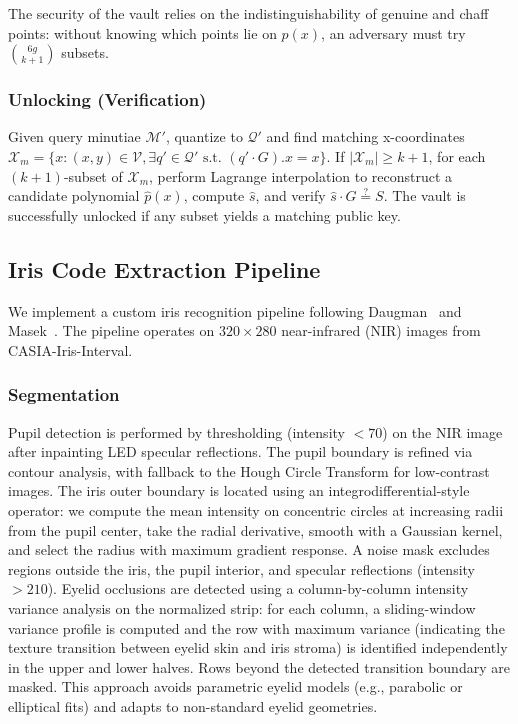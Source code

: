 \documentclass[3p,twocolumn]{elsarticle}
\begin{document}
The security of the vault relies on the indistinguishability of genuine and chaff points: without knowing which points lie on $p(x)$, an adversary must try $\binom{6g}{k+1}$ subsets.

\subsubsection{Unlocking (Verification)}
Given query minutiae $\mathcal{M}'$, quantize to $\mathcal{Q}'$ and find matching x-coordinates $\mathcal{X}_m = \{x : (x,y) \in \mathcal{V}, \exists q' \in \mathcal{Q}' \text{ s.t. } (q' \cdot G).x = x\}$. If $|\mathcal{X}_m| \geq k+1$, for each $(k{+}1)$-subset of $\mathcal{X}_m$, perform Lagrange interpolation to reconstruct a candidate polynomial $\hat{p}(x)$, compute $\hat{s}$, and verify $\hat{s} \cdot G \stackrel{?}{=} S$. The vault is successfully unlocked if any subset yields a matching public key.

\subsection{Iris Code Extraction Pipeline}
\label{sec:iris_extraction}

We implement a custom iris recognition pipeline following Daugman~\cite{daugman2004how} and Masek~\cite{masek2003thesis}. The pipeline operates on $320 \times 280$ near-infrared (NIR) images from CASIA-Iris-Interval.

\subsubsection{Segmentation}
Pupil detection is performed by thresholding (intensity $< 70$) on the NIR image after inpainting LED specular reflections. The pupil boundary is refined via contour analysis, with fallback to the Hough Circle Transform for low-contrast images. The iris outer boundary is located using an integrodifferential-style operator: we compute the mean intensity on concentric circles at increasing radii from the pupil center, take the radial derivative, smooth with a Gaussian kernel, and select the radius with maximum gradient response. A noise mask excludes regions outside the iris, the pupil interior, and specular reflections (intensity $> 210$). Eyelid occlusions are detected using a column-by-column intensity variance analysis on the normalized strip: for each column, a sliding-window variance profile is computed and the row with maximum variance (indicating the texture transition between eyelid skin and iris stroma) is identified independently in the upper and lower halves. Rows beyond the detected transition boundary are masked. This approach avoids parametric eyelid models (e.g., parabolic or elliptical fits) and adapts to non-standard eyelid geometries.
\end{document}
